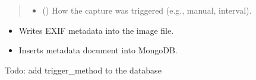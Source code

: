 \documentclass[letterpaper,10pt,english]{sphinxmanual}
\begin{document}
\begin{fulllineitems}
\begin{quote}
\begin{description}
\begin{itemize}
\item {} 
\sphinxAtStartPar
{} () \textendash{} How the capture was triggered (e.g., manual, interval).

\end{itemize}

\end{description}\end{quote}
\begin{description}
\begin{itemize}
\item {} 
\sphinxAtStartPar
Writes EXIF metadata into the image file.

\item {} 
\sphinxAtStartPar
Inserts metadata document into MongoDB.

\end{itemize}

\end{description}

\begin{sphinxtodo}{\label{\detokenize{modules/src.data_intake.data_intake.NVRConnection:id14}}Todo:}
\sphinxAtStartPar
add trigger\_method to the database
\end{sphinxtodo}

\end{fulllineitems}

\end{document}
